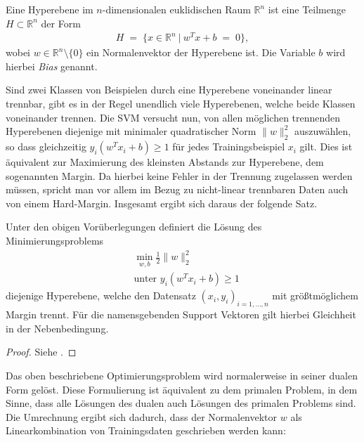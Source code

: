 \begin{defi}[Hyperebene]
	Eine Hyperebene im \(n\)-dimensionalen euklidischen Raum \(\mathbb{R}^n\) ist eine Teilmenge \(H\subset\mathbb{R}^n\) der Form
	\begin{align*}
		H\;=\;\lbrace x\in\mathbb{R}^n\:|\:w^Tx+b\;=\;0\rbrace,
	\end{align*}
	wobei \(w\in\mathbb{R}^n\setminus\lbrace0\rbrace\) ein Normalenvektor der Hyperebene ist. Die Variable \(b\) wird hierbei \textit{Bias} genannt.
\end{defi}

Sind zwei Klassen von Beispielen durch eine Hyperebene voneinander linear trennbar, gibt es in der Regel unendlich viele Hyperebenen, welche beide Klassen voneinander trennen. Die SVM versucht nun, von allen möglichen trennenden Hyperebenen diejenige mit minimaler quadratischer Norm \(\|w\|^2_2\) auszuwählen, so dass gleichzeitig \(y_i\left(w^Tx_i+b\right)\geq 1\) für jedes Trainingsbeispiel \(x_i\) gilt. Dies ist äquivalent zur Maximierung des kleinsten Abstands zur Hyperebene, dem sogenannten Margin. Da hierbei keine Fehler in der Trennung zugelassen werden müssen, spricht man vor allem im Bezug zu nicht-linear trennbaren Daten auch von einem Hard-Margin. Insgesamt ergibt sich daraus der folgende Satz.

\begin{satz}
	Unter den obigen Vorüberlegungen definiert die Lösung des Minimierungsproblems
	\begin{align*}
		&\min_{w,b} \frac{1}{2}\|w\|^2_2\\
		&\text{unter } y_i\left(w^Tx_i+b\right)\geq 1
	\end{align*}
	diejenige Hyperebene, welche den Datensatz \((x_i,y_i)_{i=1,\dots,n}\) mit größtmöglichem Margin trennt. Für die namensgebenden Support Vektoren gilt hierbei Gleichheit in der Nebenbedingung. 
\end{satz}

\begin{proof}
	Siehe \cite{SVM}.
\end{proof}

Das oben beschriebene Optimierungsproblem wird normalerweise in seiner dualen Form gelöst. Diese Formulierung ist äquivalent zu dem primalen Problem, in dem Sinne, dass alle Lösungen des dualen auch Lösungen des primalen Problems sind. Die Umrechnung ergibt sich dadurch, dass der Normalenvektor \(w\) als Linearkombination von Trainingsdaten geschrieben werden kann:

